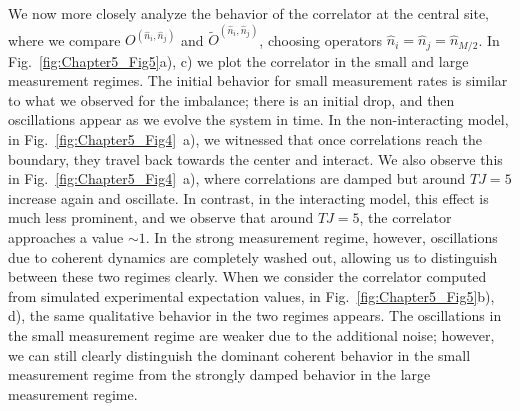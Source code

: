 We now more closely analyze the behavior of the correlator at the central site, where we compare $O^{(\hat{n}_i,\hat{n}_j)}$ and $\tilde{O}^{(\hat{n}_i,\hat{n}_j)}$, choosing operators $\hat{n}_i = \hat{n}_j = \hat{n}_{M/2}$. In Fig.~\ref{fig:Chapter5_Fig5}a), c) we plot the correlator in the small and large measurement regimes. The initial behavior for small measurement rates is similar to what we observed for the imbalance; there is an initial drop, and then oscillations appear as we evolve the system in time. In the non-interacting model, in Fig.~\ref{fig:Chapter5_Fig4}~a), we witnessed that once correlations reach the boundary, they travel back towards the center and interact. We also observe this in Fig.~\ref{fig:Chapter5_Fig4}~a), where correlations are damped but around $TJ=5$ increase again and oscillate. In contrast, in the interacting model, this effect is much less prominent, and we observe that around $TJ=5$, the correlator approaches a value $\sim 1$. In the strong measurement regime, however, oscillations due to coherent dynamics are completely washed out, allowing us to distinguish between these two regimes clearly. When we consider the correlator computed from simulated experimental expectation values, in Fig.~\ref{fig:Chapter5_Fig5}b), d), the same qualitative behavior in the two regimes appears. The oscillations in the small measurement regime are weaker due to the additional noise; however, we can still clearly distinguish the dominant coherent behavior in the small measurement regime from the strongly damped behavior in the large measurement regime. 

